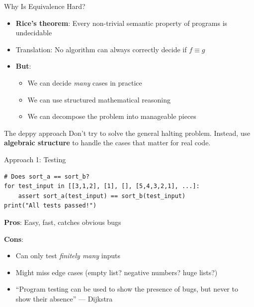 \documentclass[aspectratio=169,11pt]{beamer}
\begin{document}
\begin{frame}{Why Is Equivalence Hard?}
\begin{itemize}
\item \textbf{Rice's theorem}: Every non-trivial semantic property of programs
  is undecidable
\item Translation: No algorithm can always correctly decide if $f \equiv g$
\item \textbf{But}:
  \begin{itemize}
  \item We can decide \emph{many} cases in practice
  \item We can use structured mathematical reasoning
  \item We can decompose the problem into manageable pieces
  \end{itemize}
\end{itemize}

\vspace{0.5em}
\begin{block}{The deppy approach}
Don't try to solve the general halting problem.
Instead, use \textbf{algebraic structure} to handle the cases that
matter for real code.
\end{block}
\end{frame}

\begin{frame}[fragile]{Approach 1: Testing}
\begin{lstlisting}[language=deppy]
# Does sort_a == sort_b?
for test_input in [[3,1,2], [1], [], [5,4,3,2,1], ...]:
    assert sort_a(test_input) == sort_b(test_input)
print("All tests passed!")
\end{lstlisting}

\vspace{1em}
\textbf{Pros}: Easy, fast, catches obvious bugs

\textbf{Cons}:
\begin{itemize}
\item Can only test \emph{finitely many} inputs
\item Might miss edge cases (empty list? negative numbers? huge lists?)
\item ``Program testing can be used to show the presence of bugs,
  but never to show their absence'' --- Dijkstra
\end{itemize}
\end{frame}
\end{document}
